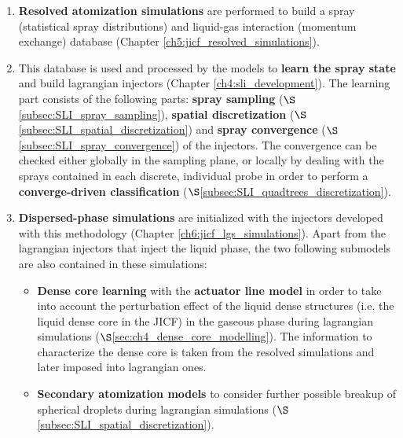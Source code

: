 \begin{enumerate}

	\item \textbf{Resolved atomization simulations} are performed to build a spray (statistical spray distributions) and liquid-gas interaction (momentum exchange) database (Chapter \ref{ch5:jicf_resolved_simulations}).
	
	\item This database is used and processed by the models to \textbf{learn the spray state} and build lagrangian injectors (Chapter \ref{ch4:sli_development}). The learning part consists of the following parts: \textbf{spray sampling} ($\S$\ref{subsec:SLI_spray_sampling}), \textbf{spatial discretization} ($\S$\ref{subsec:SLI_spatial_discretization}) and \textbf{spray convergence} ($\S$\ref{subsec:SLI_spray_convergence}) of the injectors. The convergence can be checked either globally in the sampling plane, or locally by dealing with the sprays contained in each discrete, individual probe in order to perform a \textbf{converge-driven classification} ($\S$\ref{subsec:SLI_quadtrees_discretization}).
	
	\item \textbf{Dispersed-phase simulations} are initialized with the injectors developed with this methodology (Chapter \ref{ch6:jicf_lgs_simulations}). Apart from the lagrangian injectors that inject the liquid phase, the two following submodels are also contained in these simulations: 
	
		\begin{itemize}
	
		\item \textbf{Dense core learning} with the \textbf{actuator line model} in order to take into account the perturbation effect of the liquid dense structures (i.e. the liquid dense core in the JICF) in the gaseous phase during lagrangian simulations ($\S$\ref{sec:ch4_dense_core_modelling}). The information to characterize the dense core is taken from the resolved simulations and later imposed into lagrangian ones.
		
		\item \textbf{Secondary atomization models} to consider further possible breakup of spherical droplets during lagrangian simulations ($\S$\ref{subsec:SLI_spatial_discretization}).
		
		\end{itemize}


\end{enumerate}


